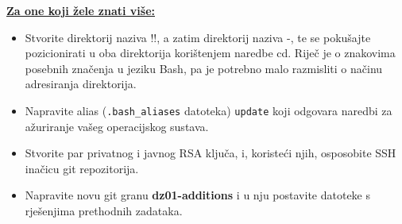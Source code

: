 \documentclass{exam}
\newcommand{\shell}[1]{\texttt{#1}}
\begin{document}
\par
\underline{\textbf{Za one koji žele znati više:}}
\begin{itemize}
\item Stvorite direktorij naziva !!, a zatim direktorij naziva -, te se pokušajte pozicionirati u oba direktorija korištenjem naredbe cd. Riječ je o znakovima posebnih značenja u jeziku Bash, pa je potrebno malo razmisliti o načinu adresiranja direktorija.
\item Napravite alias (\shell{.bash\_aliases} datoteka) \shell{update} koji odgovara naredbi za ažuriranje vašeg operacijskog sustava.
\item Stvorite par privatnog i javnog RSA ključa, i, koristeći njih, osposobite SSH inačicu git repozitorija.
\item Napravite novu git granu \textbf{dz01-additions} i u nju postavite datoteke s rješenjima prethodnih zadataka. 
\end{itemize}
\end{document}
